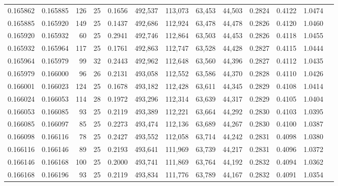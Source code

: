 \begin{tabular}{rrrrrrrrrrrrr}
0.165862 & 0.165885 & 126 &  25 &                                     0.1656 & 492,537 & 113,073 &  63,453 &  44,503 & 0.2824 & 0.4122 & 1.0474 \\
0.165885 & 0.165920 & 149 &  25 &                                     0.1437 & 492,686 & 112,924 &  63,478 &  44,478 & 0.2826 & 0.4120 & 1.0460 \\
0.165920 & 0.165932 &  60 &  25 &                                     0.2941 & 492,746 & 112,864 &  63,503 &  44,453 & 0.2826 & 0.4118 & 1.0455 \\
0.165932 & 0.165964 & 117 &  25 &                                     0.1761 & 492,863 & 112,747 &  63,528 &  44,428 & 0.2827 & 0.4115 & 1.0444 \\
0.165964 & 0.165979 &  99 &  32 &                                     0.2443 & 492,962 & 112,648 &  63,560 &  44,396 & 0.2827 & 0.4112 & 1.0435 \\
0.165979 & 0.166000 &  96 &  26 &                                     0.2131 & 493,058 & 112,552 &  63,586 &  44,370 & 0.2828 & 0.4110 & 1.0426 \\
0.166001 & 0.166023 & 124 &  25 &                                     0.1678 & 493,182 & 112,428 &  63,611 &  44,345 & 0.2829 & 0.4108 & 1.0414 \\
0.166024 & 0.166053 & 114 &  28 &                                     0.1972 & 493,296 & 112,314 &  63,639 &  44,317 & 0.2829 & 0.4105 & 1.0404 \\
0.166053 & 0.166085 &  93 &  25 &                                     0.2119 & 493,389 & 112,221 &  63,664 &  44,292 & 0.2830 & 0.4103 & 1.0395 \\
0.166085 & 0.166097 &  85 &  25 &                                     0.2273 & 493,474 & 112,136 &  63,689 &  44,267 & 0.2830 & 0.4100 & 1.0387 \\
0.166098 & 0.166116 &  78 &  25 &                                     0.2427 & 493,552 & 112,058 &  63,714 &  44,242 & 0.2831 & 0.4098 & 1.0380 \\
0.166116 & 0.166146 &  89 &  25 &                                     0.2193 & 493,641 & 111,969 &  63,739 &  44,217 & 0.2831 & 0.4096 & 1.0372 \\
0.166146 & 0.166168 & 100 &  25 &                                     0.2000 & 493,741 & 111,869 &  63,764 &  44,192 & 0.2832 & 0.4094 & 1.0362 \\
0.166168 & 0.166196 &  93 &  25 &                                     0.2119 & 493,834 & 111,776 &  63,789 &  44,167 & 0.2832 & 0.4091 & 1.0354 \\

\end{tabular}
